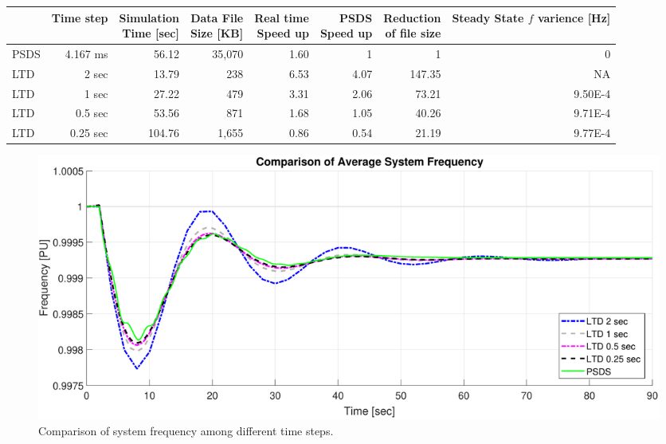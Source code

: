 \documentclass[12pt]{article}
\begin{document}
\begin{table}[!ht]
	\centering
	\footnotesize %
	\begin{tabular}{@{} lrrrrrrr @{}} 	
		\toprule %
		  & Time step  & \shortstack{Simulation\\ Time [sec] } & \shortstack{Data File \\Size [KB] }  & \shortstack{Real time \\Speed up}& \shortstack{ PSDS\\Speed up} & \shortstack{Reduction \\ of file size}  & \shortstack{Steady State $f$ \\ varience [Hz]}\\
		\midrule		
		PSDS	& 4.167 ms &  56.12   & 35,070 & 1.60& 1 & 1 & 0\\
		LTD		&	2 sec	& 13.79   &	238 &6.53&4.07 & 147.35 & NA \\ %
		LTD		&	1 sec	& 27.22   &	479 &3.31&2.06 & 73.21& 9.50E-4\\ %
		LTD		&	0.5 sec	& 53.56   &	871 &1.68&1.05 & 40.26 & 9.71E-4\\ %
		LTD		&	0.25 sec	& 104.76   &	1,655 &0.86&0.54 & 21.19& 9.77E-4\\ %
		\bottomrule
	\end{tabular}
\end{table} 
\vspace{-1em}
	\begin{figure}[h!]
			\centering
			\includegraphics[width=\linewidth]{tsComp}\vspace{-1em}
			\caption{Comparison of system frequency among different time steps.}
			\label{tsComp}		 
	\end{figure}\vspace{-.5em}
\end{document}
